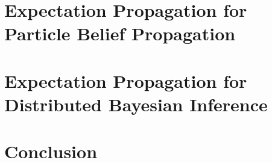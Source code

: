 \ifbgm\fi

\chapter[EPBP]{Expectation Propagation for\\ Particle Belief Propagation}

\ifpbp\fi

\chapter[EP for Distributed Bayesian Inference]{Expectation Propagation for\\ Distributed Bayesian Inference}
\ifsnep\fi

\chapter{Conclusion}




\appendix{}




\newpage
\renewcommand{\bibname}{References}

\begin{footnotesize}

\end{footnotesize}



